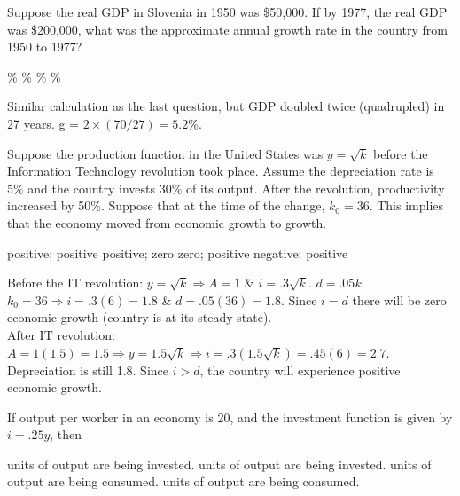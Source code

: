 \documentclass[addpoints,11pt]{exam}
\theoremstyle{definition}
\newcommand{\blank}[0]{\underline{\hspace{3cm}}}
\begin{document}
\begin{questions}
			\question Suppose the real GDP in Slovenia in 1950 was \$50,000. If by 1977, the real GDP was \$200,000, what was the approximate annual growth rate in the country from 1950 to 1977?
				
				\begin{choices}
					\%
					\%
					\%
					\%
				\end{choices}
				
				\begin{solution}
					Similar calculation as the last question, but GDP doubled twice (quadrupled) in 27 years. g = $2\times(70/27) = 5.2\%$.
				\end{solution}
				
				
			\question Suppose the production function in the United States was $y = \sqrt{k}$ before the Information Technology revolution took place. Assume the depreciation rate is 5\% and the country invests 30\% of its output. After the revolution, productivity increased by 50\%. Suppose that at the time of the change, $k_0 = 36$. This implies that the economy moved from \blank economic growth to \blank growth. 
			
			\begin{choices}
				\choice positive; positive
				\choice positive; zero
				\CorrectChoice zero; positive
				\choice negative; positive
			\end{choices}
			
			\begin{solution}
				Before the IT revolution: $y = \sqrt{k} \Rightarrow A = 1$ \& $i = .3\sqrt{k}$. $d=.05k$. $k_0 = 36 \Rightarrow i = .3(6) = 1.8$ \& $d= .05(36) = 1.8$. Since $i=d$ there will be zero economic growth (country is at its steady state). \\
				After IT revolution: $A = 1(1.5) =1.5 \Rightarrow y=1.5\sqrt{k} \Rightarrow i = .3(1.5\sqrt{k}) = .45(6) = 2.7.$ Depreciation is still 1.8. Since $i>d$, the country will experience positive economic growth.
			\end{solution} 
			
			\question If output per worker in an economy is 20, and the investment function is given by $i = .25y$, then
			
			\begin{choices}
				 units of output are being invested.
				 units of output are being invested.
				 units of output are being consumed.
				 units of output are being consumed.
			\end{choices}
		

\end{questions}
\end{document}
